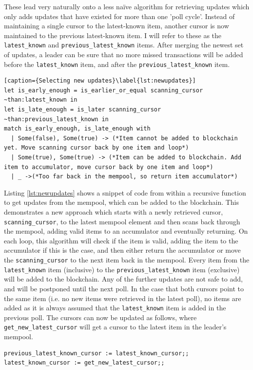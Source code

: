 \documentclass[12pt,a4paper,twoside,openright]{report}
\begin{document}
			These lead very naturally onto a less na{\"i}ve algorithm for retrieving updates which only adds updates that have existed for more than one 'poll cycle'.
			Instead of maintaining a single cursor to the latest-known item, another cursor is now maintained to the previous latest-known item. 
			I will refer to these as the \texttt{latest\_known} and \texttt{previous\_latest\_known} items.
			After merging the newest set of updates, a leader can be sure that no more missed transactions will be added before the \texttt{latest\_known} item, and after the \texttt{previous\_latest\_known} item. 
			\begin{lstlisting}[caption={Selecting new updates}\label{lst:newupdates}]
let is_early_enough = is_earlier_or_equal scanning_cursor ~than:latest_known in
let is_late_enough = is_later scanning_cursor ~than:previous_latest_known in
match is_early_enough, is_late_enough with
  | Some(false), Some(true) -> (*Item cannot be added to blockchain yet. Move scanning cursor back by one item and loop*)
  | Some(true), Some(true) -> (*Item can be added to blockchain. Add item to accumulator, move cursor back by one item and loop*)
  | _ ->(*Too far back in the mempool, so return item accumulator*)
			\end{lstlisting}

			Listing \ref{lst:newupdates} shows a snippet of code from within a recursive function to get updates from the mempool, which can be added to the blockchain.
			This demonstrates a new approach which starts with a newly retrieved cursor, \texttt{scanning\_cursor}, to the latest mempool element and then scans back through the mempool, adding valid items to an accumulator and eventually returning.
			On each loop, this algorithm will check if the item is valid, adding the item to the accumulator if this is the case, and then either return the accumulator or move the \texttt{scanning\_cursor} to the next item back in the mempool.
			Every item from the \texttt{latest\_known} item (inclusive) to the \texttt{previous\_latest\_known} item (exclusive) will be added to the blockchain. 
			Any of the further updates are not safe to add, and will be postponed until the next poll.
			In the case that both cursors point to the same item (i.e. no new items were retrieved in the latest poll), no items are added as it is always assumed that the \texttt{latest\_known} item is added in the previous poll.
			The cursors can now be updated as follows, where \texttt{get\_new\_latest\_cursor} will get a cursor to the latest item in the leader's mempool.
			\begin{lstlisting}
previous_latest_known_cursor := latest_known_cursor;;
latest_known_cursor := get_new_latest_cursor;;
			\end{lstlisting}
			
\end{document}
